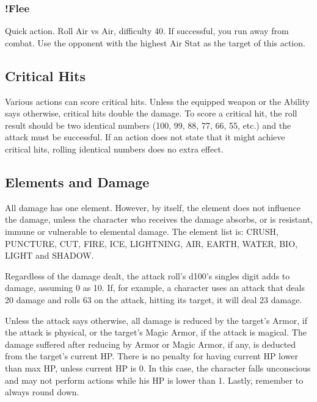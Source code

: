 \subsubsection{!Flee}
Quick action. Roll Air vs Air, difficulty 40. If
successful, you run away from combat. Use the
opponent with the highest Air Stat as the target of
this action.

\subsection{Critical Hits}
Various actions can score critical hits.
Unless the equipped weapon or the Ability says
otherwise, critical hits double the damage. To
score a critical hit, the roll result should be two
identical numbers (100, 99, 88, 77, 66, 55, etc.) and
the attack must be successful. If an action does not
state that it might achieve critical hits, rolling
identical numbers does no extra effect.

\subsection{Elements and Damage}
All damage has one element. However, by
itself, the element does not influence the damage,
unless the character who receives the damage
absorbs, or is resistant, immune or vulnerable to
elemental damage. The element list is: CRUSH,
PUNCTURE, CUT, FIRE, ICE, LIGHTNING, AIR,
EARTH, WATER, BIO, LIGHT and SHADOW.

Regardless of the damage dealt, the attack
roll’s d100’s singles digit adds to damage,
assuming 0 as 10. If, for example, a character uses
an attack that deals 20 damage and rolls 63 on the
attack, hitting its target, it will deal 23 damage.

Unless the attack says otherwise, all
damage is reduced by the target's Armor, if the
attack is physical, or the target’s Magic Armor, if
the attack is magical. The damage suffered after
reducing by Armor or Magic Armor, if any, is
deducted from the target’s current HP. There is no
penalty for having current HP lower than max HP,
unless current HP is 0. In this case, the character
falls unconscious and may not perform actions
while his HP is lower than 1. Lastly, remember to
always round down.

